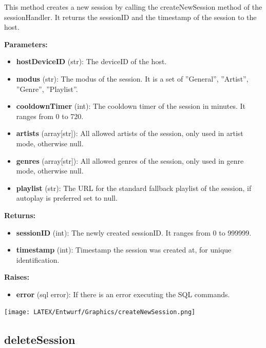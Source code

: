 \documentclass[oneside, ngerman]{sdqtechreport}
\begin{document}
This method creates a new session by calling the createNewSession method of the sessionHandler. It returns the sessionID and the timestamp of the session to the host.

\textbf{Parameters:}

\begin{itemize}
    \item \textbf{hostDeviceID} (str): The deviceID of the host.
    \item \textbf{modus} (str): The modus of the session. It is a set of ''General'', ''Artist'', ''Genre'', ''Playlist''.
    \item \textbf{cooldownTimer} (int): The cooldown timer of the session in minutes. It ranges from 0 to 720.
    \item \textbf{artists} (array[str]): All allowed artists of the session, only used in artist mode, otherwise null.
    \item \textbf{genres} (array[str]): All allowed genres of the session, only used in genre mode, otherwise null.
    \item \textbf{playlist} (str): The URL for the standard fallback playlist of the session, if autoplay is preferred set to null.
\end{itemize}

\textbf{Returns:}

\begin{itemize}
    \item \textbf{sessionID} (int): The newly created sessionID. It ranges from 0 to 999999.
    \item \textbf{timestamp} (int): Timestamp the session was created at, for unique identification.
\end{itemize}

\textbf{Raises:}

\begin{itemize}
    \item \textbf{error} (sql error): If there is an error executing the SQL commands.
\end{itemize}

\begin{center}
   \texttt{[image: LATEX/Entwurf/Graphics/createNewSession.png]} 
\end{center}




\subsection*{deleteSession}
\end{document}
